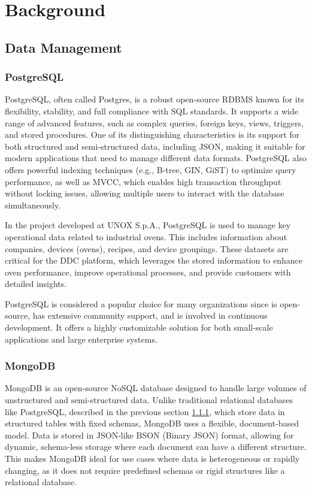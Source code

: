 
\chapter{Background}
\label{chp:background}

\section{Data Management}
\subsection{PostgreSQL}
\label{sec:postgres}
PostgreSQL, often called Postgres, is a robust open-source \ac{RDBMS} known for its flexibility, stability, and full compliance with \ac{SQL} standards. It supports a wide range of advanced features, such as complex queries, foreign keys, views, triggers, and stored procedures. One of its distinguishing characteristics is its support for both structured and semi-structured data, including \ac{JSON}, making it suitable for modern applications that need to manage different data formats. PostgreSQL also offers powerful indexing techniques (e.g., B-tree, GIN, GiST) to optimize query performance, as well as \ac{MVCC}, which enables high transaction throughput without locking issues, allowing multiple users to interact with the database simultaneously.

In the project developed at UNOX S.p.A., PostgreSQL is used to manage key operational data related to industrial ovens. This includes information about companies, devices (ovens), recipes, and device groupings. These datasets are critical for the \ac{DDC} platform, which leverages the stored information to enhance oven performance, improve operational processes, and provide customers with detailed insights.

PostgreSQL is considered a popular choice for many organizations since is open-source, has extensive community support, and is involved in continuous development. It offers a highly customizable solution for both small-scale applications and large enterprise systems.

\subsection{MongoDB}
MongoDB is an open-source NoSQL database designed to handle large volumes of unstructured and semi-structured data. Unlike traditional relational databases like PostgreSQL, described in the previous section \ref{sec:postgres}, which store data in structured tables with fixed schemas, MongoDB uses a flexible, document-based model. Data is stored in \ac{JSON}-like BSON (Binary \ac{JSON}) format, allowing for dynamic, schema-less storage where each document can have a different structure. This makes MongoDB ideal for use cases where data is heterogeneous or rapidly changing, as it does not require predefined schemas or rigid structures like a relational database.


